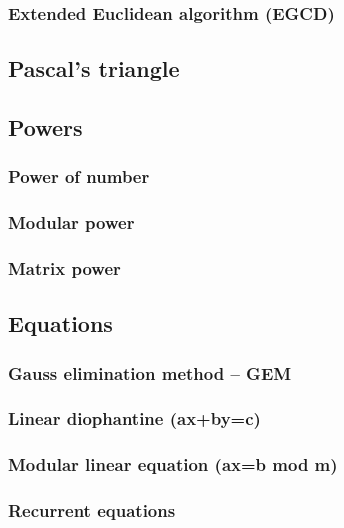 \documentclass[a4paper]{article}
\begin{document}
\begin{multicols*}{2}
        \subsubsection{Extended Euclidean algorithm (EGCD)}
            
    \subsection{Pascal's triangle}
        
    \subsection{Powers}
        \subsubsection{Power of number}
            
        \subsubsection{Modular power}
            
        \subsubsection{Matrix power}
            
    \subsection{Equations}
        \subsubsection{Gauss elimination method -- GEM}
            
        \subsubsection{Linear diophantine (ax+by=c)}
            
        \subsubsection{Modular linear equation (ax=b mod m)}
            
        \subsubsection{Recurrent equations}
            

\end{multicols*}
\end{document}

